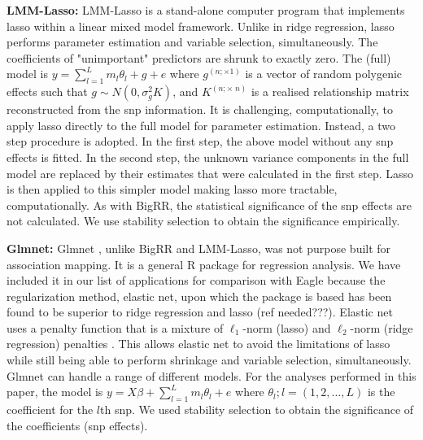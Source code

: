 \documentclass{nature}
\begin{document}
\textbf{LMM-Lasso:} LMM-Lasso  \cite{rakitsch2013lasso} is a stand-alone computer program that implements lasso within a linear mixed model 
framework. Unlike in ridge regression, lasso performs parameter estimation and variable selection, simultaneously.   The 
coefficients of "unimportant" predictors are shrunk to exactly zero.
The (full) model is 
$y =  \sum_{l=1}^L m_l \theta_l +   g  + e$ where $g^{(n ; \times 1)}$ is a vector of random polygenic effects such that 
$g \sim N(0, \sigma^2_g K)$, and $K^{(n ; \times \; n)}$ is a realised relationship matrix reconstructed from the snp information. 
It is challenging, computationally,  to apply lasso directly to the full model for parameter estimation. Instead, a two step procedure 
is adopted. In the first step, the above model without any snp effects is fitted. In the second step, 
the unknown variance components in the full model are replaced by their estimates 
that were calculated in the first step. Lasso is then applied to this simpler model making lasso more tractable, computationally. 
As with BigRR,  the statistical significance of the snp effects are not calculated. We use stability selection to obtain the 
significance empirically. 

\textbf{Glmnet:} Glmnet  \cite{Friedman2010glmnet}, unlike BigRR and LMM-Lasso, was not purpose built for 
association mapping.  It is a general R package for 
regression analysis. We have included it in our list of applications for comparison with Eagle because the 
regularization method, elastic net, upon which the package is based has been found to be superior to ridge regression and 
lasso (ref needed???).  Elastic net uses a penalty function that is a mixture of 
$\ell_1$-norm (lasso) and $\ell_2$-norm (ridge regression) penalties  \cite{zou2005regularization}. 
This allows elastic net to avoid the limitations of lasso 
while still being able to perform shrinkage and variable selection, simultaneously. 
Glmnet can handle a range of different models. For the analyses performed in this paper, the model is 
$y = X \beta + \sum_{l=1}^L m_l \theta_l + e$ where $\theta_l; l=(1,2, \ldots, L)$ is the coefficient for the $l$th snp. 
We used stability selection to obtain the significance of the coefficients (snp effects). 
\end{document}
